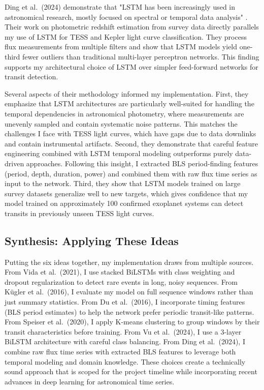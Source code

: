 \documentclass[letterpaper]{article}
\begin{document}
Ding et al.\ (2024) demonstrate that "LSTM has been increasingly used in astronomical research, mostly focused on spectral or temporal data analysis" \cite{Ding2024photometric}. Their work on photometric redshift estimation from survey data directly parallels my use of LSTM for TESS and Kepler light curve classification. They process flux measurements from multiple filters and show that LSTM models yield one-third fewer outliers than traditional multi-layer perceptron networks. This finding supports my architectural choice of LSTM over simpler feed-forward networks for transit detection.

Several aspects of their methodology informed my implementation. First, they emphasize that LSTM architectures are particularly well-suited for handling the temporal dependencies in astronomical photometry, where measurements are unevenly sampled and contain systematic noise patterns. This matches the challenges I face with TESS light curves, which have gaps due to data downlinks and contain instrumental artifacts. Second, they demonstrate that careful feature engineering combined with LSTM temporal modeling outperforms purely data-driven approaches. Following this insight, I extracted BLS period-finding features (period, depth, duration, power) and combined them with raw flux time series as input to the network. Third, they show that LSTM models trained on large survey datasets generalize well to new targets, which gives confidence that my model trained on approximately 100 confirmed exoplanet systems can detect transits in previously unseen TESS light curves.

\subsection{Synthesis: Applying These Ideas}

Putting the six ideas together, my implementation draws from multiple sources. From Vida et al.\ (2021), I use stacked BiLSTMs with class weighting and dropout regularization to detect rare events in long, noisy sequences. From Kügler et al.\ (2016), I evaluate my model on full sequence windows rather than just summary statistics. From Du et al.\ (2016), I incorporate timing features (BLS period estimates) to help the network prefer periodic transit-like patterns. From Speiser et al.\ (2020), I apply K-means clustering to group windows by their transit characteristics before training. From Vu et al.\ (2024), I use a 3-layer BiLSTM architecture with careful class balancing. From Ding et al.\ (2024), I combine raw flux time series with extracted BLS features to leverage both temporal modeling and domain knowledge. These choices create a technically sound approach that is scoped for the project timeline while incorporating recent advances in deep learning for astronomical time series.
\end{document}
